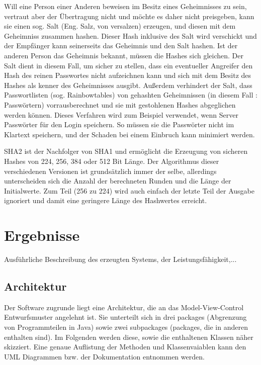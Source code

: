 \documentclass[12pt,a4paper,bibliography=totocnumbered,listof=totocnumbered]{scrartcl}
\begin{document}
Will eine Person einer Anderen beweisen im Besitz eines Geheimnisses zu sein, vertraut aber der Übertragung nicht und möchte es daher nicht preisgeben, kann sie einen sog. Salt (Eng. Salz, von versalzen) erzeugen, und diesen mit dem Geheimniss zusammen hashen. Dieser Hash inklusive des Salt wird verschickt und der Empfänger kann seinerseits das Geheimnis und den Salt hashen. Ist der anderen Person das Geheimnis bekannt, müssen die Hashes sich gleichen. Der Salt dient in diesem Fall, um sicher zu stellen, dass ein eventueller Angreifer den Hash des reinen Passwortes nicht aufzeichnen kann und sich mit dem Besitz des Hashes als kenner des Geheimnisses ausgibt. Außerdem verhindert der Salt, dass Passwortlisten (sog. Rainbowtables) von gehashten Geheimnissen (in diesem Fall : Passwörtern) vorrausberechnet und sie mit gestohlenen Hashes abgeglichen werden können. Dieses Verfahren wird zum Beispiel verwendet, wenn Server Passwörter für den Login speichern. So müssen sie die Passwörter nicht im Klartext speichern, und der Schaden bei einem Einbruch kann minimiert werden. 

SHA2 ist der Nachfolger von SHA1 und ermöglicht die Erzeugung von sicheren Hashes von 224, 256, 384 oder 512 Bit Länge. Der Algorithmus dieser verschiedenen Versionen ist grundsätzlich immer der selbe, allerdings unterscheiden sich die Anzahl der berechneten Runden und die Länge der Initialwerte. Zum Teil (256 zu 224) wird auch einfach der letzte Teil der Ausgabe ignoriert und damit eine geringere Länge des Hashwertes erreicht. \cite{8}\cite{9}\cite{10}\\
\pagebreak



\section{Ergebnisse}
Ausführliche Beschreibung des erzeugten Systems, der Leistungsfähigkeit,...
\subsection{Architektur}
Der Software zugrunde liegt eine Architektur, die an das Model-View-Control Entwurfsmuster angelehnt ist. Sie unterteilt sich in drei packages (Abgrenzung von Programmteilen in Java) sowie zwei subpackages (packages, die in anderen enthalten sind). Im Folgenden werden diese, sowie die enthaltenen Klassen näher skizziert. Eine genaue Auflistung der Methoden und Klassenvaiablen kann den UML Diagrammen bzw. der Dokumentation entnommen werden.
\end{document}
